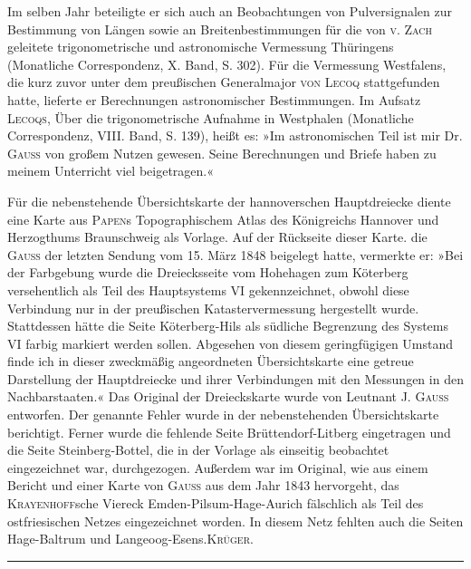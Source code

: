 \par\noindent\hspace*{\parindent}Im selben Jahr beteiligte er sich auch an Beobachtungen von Pulversignalen zur Bestimmung von Längen sowie an Breitenbestimmungen für die von \textsc{v. Zach} geleitete trigonometrische und astronomische Vermessung Thüringens (Monatliche Correspondenz, X. Band, S. 302). Für die Vermessung Westfalens, die kurz zuvor unter dem preußischen Generalmajor \textsc{von Lecoq} stattgefunden hatte, lieferte er Berechnungen astronomischer Bestimmungen. Im Aufsatz \textsc{Lecoqs}, Über die trigonometrische Aufnahme in Westphalen (Monatliche Correspondenz, VIII. Band, S. 139), heißt es: »Im astronomischen Teil ist mir Dr. \textsc{Gauss} von großem Nutzen gewesen. Seine Berechnungen und Briefe haben zu meinem Unterricht viel beigetragen.«
\par\bigskip
\par\noindent\hspace*{\parindent}Für die nebenstehende Übersichtskarte der hannoverschen Hauptdreiecke diente eine Karte aus \textsc{Papen}s Topographischem Atlas des Königreichs Hannover und Herzogthums Braunschweig als Vorlage. Auf der Rückseite dieser Karte. die \textsc{Gauss} der letzten Sendung vom 15. März 1848 beigelegt hatte, vermerkte er: »Bei der Farbgebung wurde die Dreiecksseite vom Hohehagen zum Köterberg versehentlich als Teil des Hauptsystems VI gekennzeichnet, obwohl diese Verbindung nur in der preußischen Katastervermessung hergestellt wurde. Stattdessen hätte die Seite Köterberg-Hils als südliche Begrenzung des Systems VI farbig markiert werden sollen. Abgesehen von diesem geringfügigen Umstand finde ich in dieser zweckmäßig angeordneten Übersichtskarte eine getreue Darstellung der Hauptdreiecke und ihrer Verbindungen mit den Messungen in den Nachbarstaaten.« Das Original der Dreieckskarte wurde von Leutnant J. \textsc{Gauss} entworfen. Der genannte Fehler wurde in der nebenstehenden Übersichtskarte berichtigt. Ferner wurde die fehlende Seite Brüttendorf-Litberg eingetragen und die Seite Steinberg-Bottel, die in der Vorlage als einseitig beobachtet eingezeichnet war, durchgezogen. Außerdem war im Original, wie aus einem Bericht und einer Karte von \textsc{Gauss} aus dem Jahr 1843 hervorgeht, das \textsc{Krayenhoff}sche Viereck Emden-Pilsum-Hage-Aurich fälschlich als Teil des ostfriesischen Netzes eingezeichnet worden. In diesem Netz fehlten auch die Seiten Hage-Baltrum und Langeoog-Esens.\hfill\textsc{Krüger}.
\begin{center}\rule{2.6cm}{0.4pt}\end{center}
\par\endgroup

